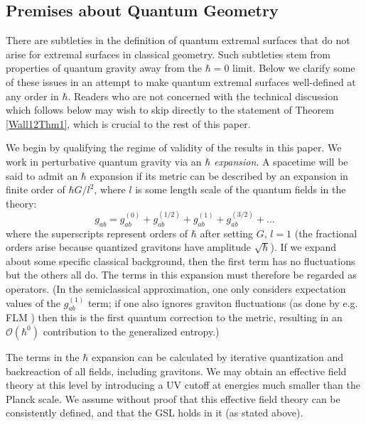 \documentclass[12pt]{article}
\theoremstyle{remark}
\numberwithin{equation}{section}
\numberwithin{equation}{section}
\begin{document}
\subsection{Premises about Quantum Geometry}\label{Premises}

There are subtleties in the definition of quantum extremal surfaces that do not arise for extremal surfaces in classical geometry. Such subtleties stem from properties of quantum gravity away from the $\hbar=0$ limit. Below we clarify some of these issues in an attempt to make quantum extremal surfaces well-defined at any order in $\hbar$. Readers who are not concerned with the technical discussion which follows below may wish to skip directly to the statement of Theorem \ref{Wall12Thm1}, which is crucial to the rest of this paper.

We begin by qualifying the regime of validity of the results in this paper.  We work in perturbative quantum gravity via an $\hbar$ \emph{expansion}. A spacetime will be said to admit an $\hbar$ expansion if its metric can be described by an expansion in finite order of $\hbar G/l^{2}$, where $l$ is some length scale of the quantum fields in the theory:
\begin{equation}
g_{ab} = g_{ab}^{(0)} + g_{ab}^{(1/2)} + g_{ab}^{(1)} + g_{ab}^{(3/2)} + \ldots
\end{equation}
where the superscripts represent orders of $\hbar$ after setting $G,\,l = 1$ (the fractional orders arise because quantized gravitons have amplitude $\sqrt{\hbar}$).  If we expand about some specific classical background, then the first term has no fluctuations but the others all do.  The terms in this expansion must therefore be regarded as operators.  (In the semiclassical approximation, one only considers expectation values of the $g_{ab}^{(1)}$ term; if one also ignores graviton fluctuations (as done by e.g. FLM \cite{FaulknerLewkowyczMaldacena}) then this is the first quantum correction to the metric, resulting in an $\mathcal{O}(\hbar^{0})$ contribution to the generalized entropy.)

The terms in the $\hbar$ expansion can be calculated by iterative quantization and backreaction of all fields, including gravitons.  We may obtain an effective field theory at this level by introducing a UV cutoff at energies much smaller than the Planck scale.  We assume without proof that this effective field theory can be consistently defined, and that the GSL holds in it (as stated above).  

\end{document}
